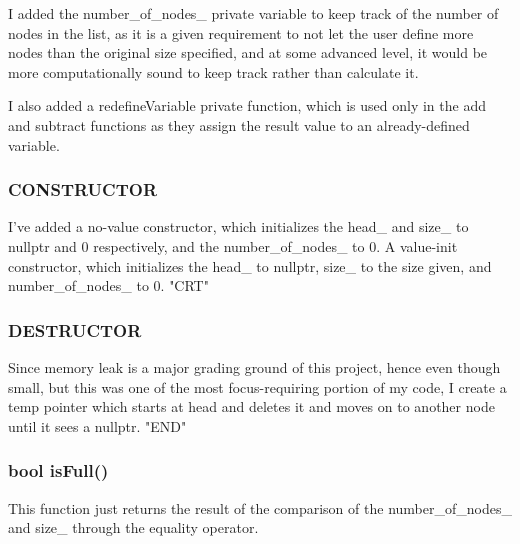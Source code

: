 \documentclass[a4paper]{article}
\begin{document}
    I added the {\color{LimeGreen}number\_of\_nodes\_} private variable to keep 
    track of the number of nodes in the list, as it is a given requirement 
    to not let the user define more nodes than the original size specified, 
    and at some advanced level, it would be more computationally sound to keep 
    track rather than calculate it.

    I also added a redefineVariable private function, which is 
    used only in the add and subtract functions as they assign the result value 
    to an already-defined variable.
    \subsubsection{\color{draculapurple}CONSTRUCTOR}
    I've added a no-value constructor, which initializes the {\color{LimeGreen}head\_} and 
    {\color{LimeGreen}size\_} to nullptr and 0 respectively, and the {\color{LimeGreen}number\_of\_nodes\_} to 0.
    A value-init constructor, which initializes the {\color{LimeGreen}head\_} to nullptr, 
    {\color{LimeGreen}size\_} to the size given, and {\color{LimeGreen}number\_of\_nodes\_} to 0. "CRT"
    \subsubsection{\color{draculapurple}DESTRUCTOR}
    Since memory leak is a major grading ground of this project, 
    hence even though small, but this was one of the most focus-requiring 
    portion of my code, I create a temp pointer which starts at head and deletes 
    it and moves on to another node until it sees a {\color{LightPink}nullptr}. "END"
    \subsubsection{{\color{orange}bool} {\color{draculapurple}isFull}()}
    This function just returns the result of the comparison of the 
    {\color{LimeGreen}number\_of\_nodes\_} and {\color{LimeGreen}size\_} through the equality operator.
\end{document}
